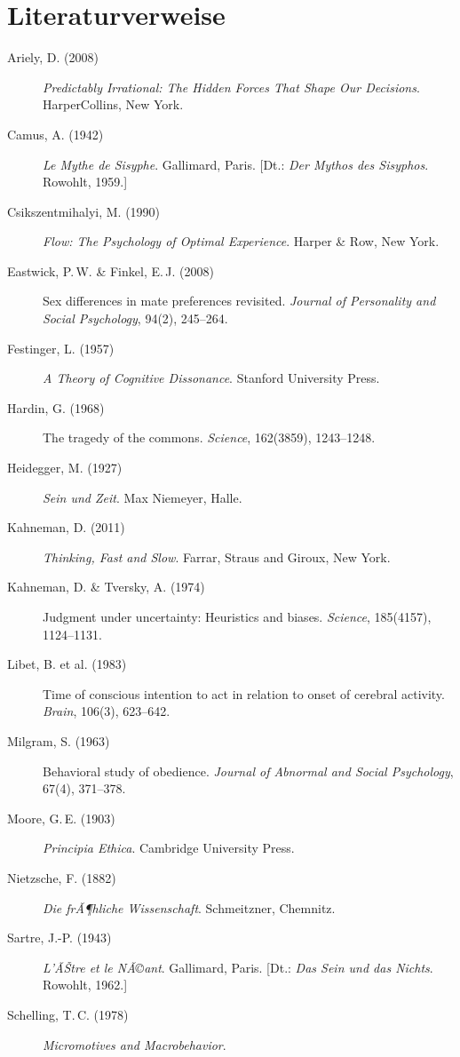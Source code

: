 ﻿\documentclass[12pt, a4paper]{article}
\begin{document}
\section*{Literaturverweise}

\begin{description}
  \item[Ariely, D. (2008)] \textit{Predictably Irrational: The Hidden Forces
    That Shape Our Decisions}. HarperCollins, New York.
  \item[Camus, A. (1942)] \textit{Le Mythe de Sisyphe}. Gallimard, Paris.
    [Dt.: \textit{Der Mythos des Sisyphos}. Rowohlt, 1959.]
  \item[Csikszentmihalyi, M. (1990)] \textit{Flow: The Psychology of Optimal
    Experience}. Harper \& Row, New York.
  \item[Eastwick, P.\,W. \& Finkel, E.\,J. (2008)] Sex differences in mate
    preferences revisited. \textit{Journal of Personality and Social Psychology},
    94(2), 245--264.
  \item[Festinger, L. (1957)] \textit{A Theory of Cognitive Dissonance}.
    Stanford University Press.
  \item[Hardin, G. (1968)] The tragedy of the commons. \textit{Science},
    162(3859), 1243--1248.
  \item[Heidegger, M. (1927)] \textit{Sein und Zeit}. Max Niemeyer, Halle.
  \item[Kahneman, D. (2011)] \textit{Thinking, Fast and Slow}. Farrar, Straus
    and Giroux, New York.
  \item[Kahneman, D. \& Tversky, A. (1974)] Judgment under uncertainty:
    Heuristics and biases. \textit{Science}, 185(4157), 1124--1131.
  \item[Libet, B. et al. (1983)] Time of conscious intention to act in relation
    to onset of cerebral activity. \textit{Brain}, 106(3), 623--642.
  \item[Milgram, S. (1963)] Behavioral study of obedience. \textit{Journal of
    Abnormal and Social Psychology}, 67(4), 371--378.
  \item[Moore, G.\,E. (1903)] \textit{Principia Ethica}. Cambridge University Press.
  \item[Nietzsche, F. (1882)] \textit{Die frÃ¶hliche Wissenschaft}. Schmeitzner,
    Chemnitz.
  \item[Sartre, J.-P. (1943)] \textit{L'ÃŠtre et le NÃ©ant}. Gallimard, Paris.
    [Dt.: \textit{Das Sein und das Nichts}. Rowohlt, 1962.]
  \item[Schelling, T.\,C. (1978)] \textit{Micromotives and Macrobehavior}.

\end{description}
\end{document}
